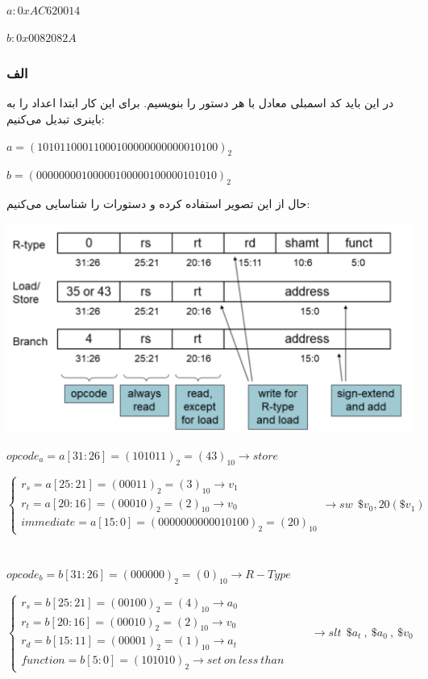 \setLTR
$a: 0xAC620014$

$b: 0x0082082A$
\setRTL

\subsubsection*{الف}
در این باید کد اسمبلی معادل با هر دستور را بنویسیم. برای این کار ابتدا اعداد را به باینری تبدیل می‌کنیم:
\setLTR

$a=(10101100011000100000000000010100)_2$

$b=(00000000100000100000100000101010)_2$

\setRTL

حال از این تصویر استفاده کرده و دستورات را شناسایی می‌کنیم:

\setLTR
\qquad\qquad\includegraphics[scale=0.5]{figs/1.png}

$opcode_a = a[31:26] = (101011)_2 = (43)_{10} \longrightarrow store$

$
\begin{cases}
	r_s = a[25:21] = (00011)_2 = (3)_{10} \longrightarrow v_1 \\ 
	r_t = a[20:16] = (00010)_2 = (2)_{10} \longrightarrow v_0 \\
	immediate = a[15:0] = (0000000000010100)_2 = (20)_{10}
\end{cases}\longrightarrow
sw \ \ \$v_0 , 20(\$v_1)
$\\ \\ \\

$opcode_b = b[31:26] = (000000)_2 = (0)_{10} \longrightarrow R-Type$

$
\begin{cases}
	r_s = b[25:21] = (00100)_2 = (4)_{10} \longrightarrow a_0 \\ 
	r_t = b[20:16] = (00010)_2 = (2)_{10} \longrightarrow v_0 \\
	r_d = b[15:11] = (00001)_2 = (1)_{10} \longrightarrow a_t \\
	function = b[5:0] = (101010)_2 \longrightarrow set \ on \ less \ than 
\end{cases} \qquad \longrightarrow
slt \ \ \$a_t \ ,\ \$a_0 \ , \ \$v_0
$\\ \\ \\
\setRTL

